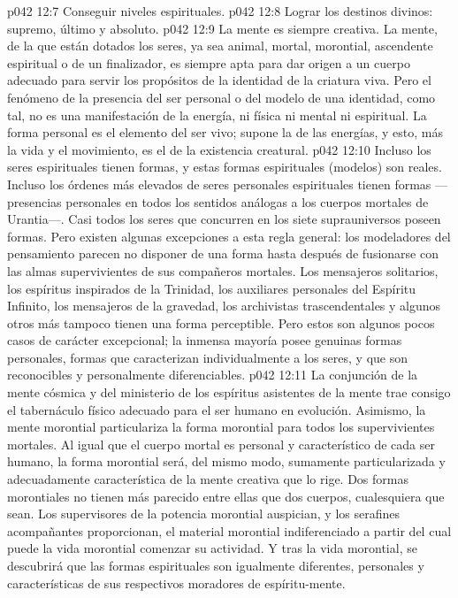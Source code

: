 \vs p042 12:7 Conseguir niveles espirituales.
\vs p042 12:8 Lograr los destinos divinos: supremo, último y absoluto.
\vs p042 12:9 \pc La mente es siempre creativa. La mente, de la que están dotados los seres, ya sea animal, mortal, morontial, ascendente espiritual o de un finalizador, es siempre apta para dar origen a un cuerpo adecuado para servir los propósitos de la identidad de la criatura viva. Pero el fenómeno de la presencia del ser personal o del modelo de una identidad, como tal, no es una manifestación de la energía, ni física ni mental ni espiritual. La forma personal es el elemento  del ser vivo; supone la  de las energías, y esto, más la vida y el movimiento, es el  de la existencia creatural.
\vs p042 12:10 Incluso los seres espirituales tienen formas, y estas formas espirituales (modelos) son reales. Incluso los órdenes más elevados de seres personales espirituales tienen formas ---presencias personales en todos los sentidos análogas a los cuerpos mortales de Urantia---. Casi todos los seres que concurren en los siete suprauniversos poseen formas. Pero existen algunas excepciones a esta regla general: los modeladores del pensamiento parecen no disponer de una forma hasta después de fusionarse con las almas supervivientes de sus compañeros mortales. Los mensajeros solitarios, los espíritus inspirados de la Trinidad, los auxiliares personales del Espíritu Infinito, los mensajeros de la gravedad, los archivistas trascendentales y algunos otros más tampoco tienen una forma perceptible. Pero estos son algunos pocos casos de carácter excepcional; la inmensa mayoría posee genuinas formas personales, formas que caracterizan individualmente a los seres, y que son reconocibles y personalmente diferenciables.
\vs p042 12:11 La conjunción de la mente cósmica y del ministerio de los espíritus asistentes de la mente trae consigo el tabernáculo físico adecuado para el ser humano en evolución. Asimismo, la mente morontial particulariza la forma morontial para todos los supervivientes mortales. Al igual que el cuerpo mortal es personal y característico de cada ser humano, la forma morontial será, del mismo modo, sumamente particularizada y adecuadamente característica de la mente creativa que lo rige. Dos formas morontiales no tienen más parecido entre ellas que dos cuerpos, cualesquiera que sean. Los supervisores de la potencia morontial auspician, y los serafines acompañantes proporcionan, el material morontial indiferenciado a partir del cual puede la vida morontial comenzar su actividad. Y tras la vida morontial, se descubrirá que las formas espirituales son igualmente diferentes, personales y características de sus respectivos moradores de espíritu\hyp{}mente.
